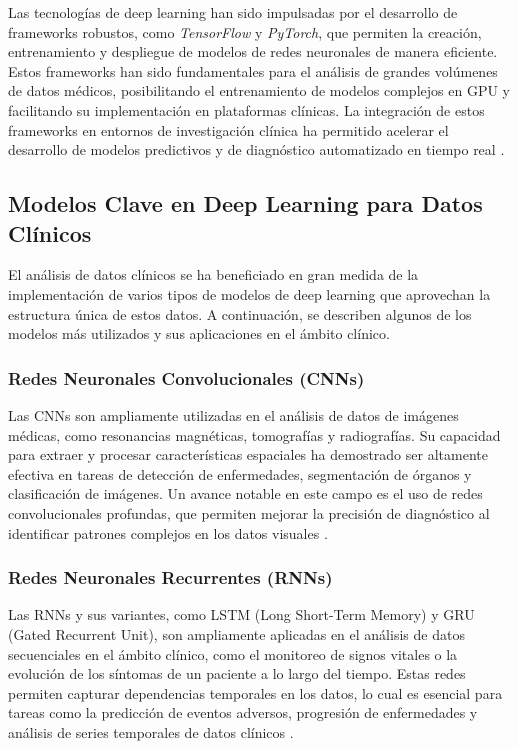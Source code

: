 \documentclass{article}
\begin{document}
Las tecnologías de deep learning han sido impulsadas por el desarrollo de frameworks robustos, como \textit{TensorFlow} y \textit{PyTorch}, que permiten la creación, entrenamiento y despliegue de modelos de redes neuronales de manera eficiente. Estos frameworks han sido fundamentales para el análisis de grandes volúmenes de datos médicos, posibilitando el entrenamiento de modelos complejos en GPU y facilitando su implementación en plataformas clínicas. La integración de estos frameworks en entornos de investigación clínica ha permitido acelerar el desarrollo de modelos predictivos y de diagnóstico automatizado en tiempo real \cite{abadi2016tensorflow, paszke2019pytorch}.

\subsection{Modelos Clave en Deep Learning para Datos Clínicos}

El análisis de datos clínicos se ha beneficiado en gran medida de la implementación de varios tipos de modelos de deep learning que aprovechan la estructura única de estos datos. A continuación, se describen algunos de los modelos más utilizados y sus aplicaciones en el ámbito clínico.

\subsubsection{Redes Neuronales Convolucionales (CNNs)}

Las CNNs son ampliamente utilizadas en el análisis de datos de imágenes médicas, como resonancias magnéticas, tomografías y radiografías. Su capacidad para extraer y procesar características espaciales ha demostrado ser altamente efectiva en tareas de detección de enfermedades, segmentación de órganos y clasificación de imágenes. Un avance notable en este campo es el uso de redes convolucionales profundas, que permiten mejorar la precisión de diagnóstico al identificar patrones complejos en los datos visuales \cite{litjens2017survey}.

\subsubsection{Redes Neuronales Recurrentes (RNNs)}

Las RNNs y sus variantes, como LSTM (Long Short-Term Memory) y GRU (Gated Recurrent Unit), son ampliamente aplicadas en el análisis de datos secuenciales en el ámbito clínico, como el monitoreo de signos vitales o la evolución de los síntomas de un paciente a lo largo del tiempo. Estas redes permiten capturar dependencias temporales en los datos, lo cual es esencial para tareas como la predicción de eventos adversos, progresión de enfermedades y análisis de series temporales de datos clínicos \cite{choi2016doctor}.
\end{document}
